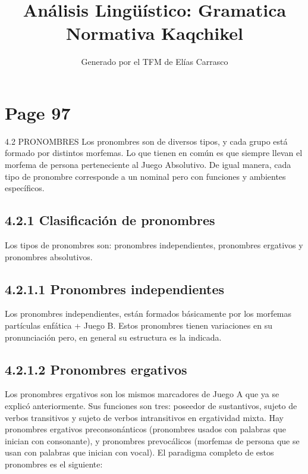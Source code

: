 \documentclass{article}%
\title{Análisis Lingüístico: Gramatica Normativa Kaqchikel}%
\author{Generado por el TFM de Elías Carrasco}%
\begin{document}
%
\normalsize%
\maketitle%
\section{Page 97}%
\label{sec:Page97}%
4.2 PRONOMBRES %
Los pronombres son de diversos tipos, y cada grupo está formado por distintos %
morfemas. Lo que tienen en común es que siempre llevan el morfema de persona %
perteneciente al Juego Absolutivo. De igual manera, cada tipo de pronombre corresponde %
a un nominal pero con funciones y ambientes específicos. %
\subsection{4.2.1 Clasificación de pronombres}%
\label{subsec:4.2.1Clasificacindepronombres}%

%
Los tipos de pronombres son: pronombres independientes, pronombres ergativos y %
pronombres absolutivos. %
\subsection{4.2.1.1 Pronombres independientes}%
\label{subsec:4.2.1.1Pronombresindependientes}%

%
Los pronombres independientes, están formados básicamente por los morfemas %
partículas enfática + Juego B. Estos pronombres tienen variaciones en su %
pronunciación pero, en general su estructura es la indicada. %
\subsection{4.2.1.2 Pronombres ergativos}%
\label{subsec:4.2.1.2Pronombresergativos}%

%
Los pronombres ergativos son los mismos marcadores de Juego A que ya se %
explicó anteriormente. Sus funciones son tres: poseedor de sustantivos, sujeto de %
verbos transitivos y sujeto de verbos intransitivos en ergatividad mixta. Hay %
pronombres ergativos preconsonánticos (pronombres usados con palabras que inician %
con consonante), y pronombres prevocálicos (morfemas de persona que se usan con %
palabras que inician con vocal). El paradigma completo de estos pronombres es el %
siguiente: 

%
\end{document}
